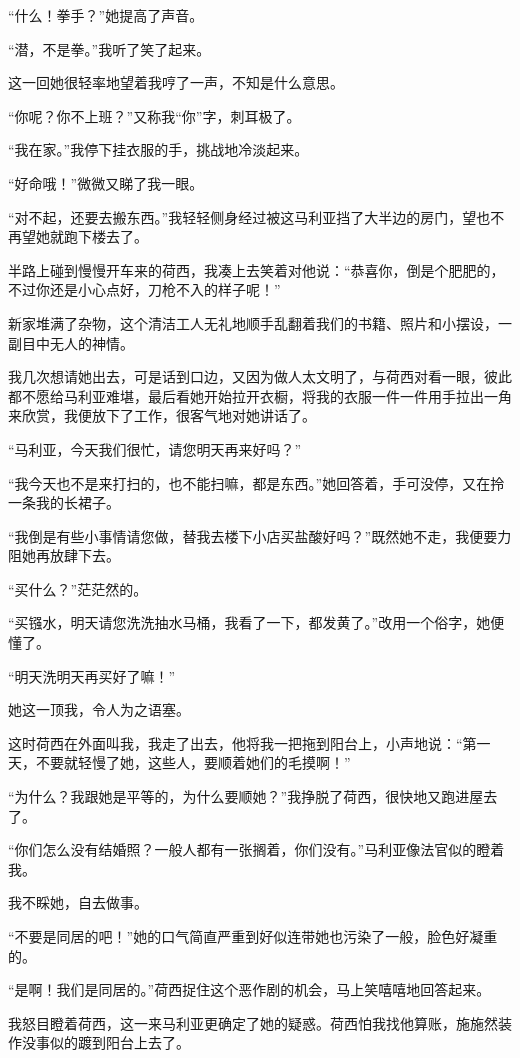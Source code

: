 \par “什么！拳手？”她提高了声音。
\par “潜，不是拳。”我听了笑了起来。
\par 这一回她很轻率地望着我哼了一声，不知是什么意思。
\par “你呢？你不上班？”又称我“你”字，刺耳极了。
\par “我在家。”我停下挂衣服的手，挑战地冷淡起来。
\par “好命哦！”微微又睇了我一眼。
\par “对不起，还要去搬东西。”我轻轻侧身经过被这马利亚挡了大半边的房门，望也不再望她就跑下楼去了。
\par 半路上碰到慢慢开车来的荷西，我凑上去笑着对他说：“恭喜你，倒是个肥肥的，不过你还是小心点好，刀枪不入的样子呢！”
\par 新家堆满了杂物，这个清洁工人无礼地顺手乱翻着我们的书籍、照片和小摆设，一副目中无人的神情。
\par 我几次想请她出去，可是话到口边，又因为做人太文明了，与荷西对看一眼，彼此都不愿给马利亚难堪，最后看她开始拉开衣橱，将我的衣服一件一件用手拉出一角来欣赏，我便放下了工作，很客气地对她讲话了。
\par “马利亚，今天我们很忙，请您明天再来好吗？”
\par “我今天也不是来打扫的，也不能扫嘛，都是东西。”她回答着，手可没停，又在拎一条我的长裙子。
\par “我倒是有些小事情请您做，替我去楼下小店买盐酸好吗？”既然她不走，我便要力阻她再放肆下去。
\par “买什么？”茫茫然的。
\par “买镪水，明天请您洗洗抽水马桶，我看了一下，都发黄了。”改用一个俗字，她便懂了。
\par “明天洗明天再买好了嘛！”
\par 她这一顶我，令人为之语塞。
\par 这时荷西在外面叫我，我走了出去，他将我一把拖到阳台上，小声地说：“第一天，不要就轻慢了她，这些人，要顺着她们的毛摸啊！”
\par “为什么？我跟她是平等的，为什么要顺她？”我挣脱了荷西，很快地又跑进屋去了。
\par “你们怎么没有结婚照？一般人都有一张搁着，你们没有。”马利亚像法官似的瞪着我。
\par 我不睬她，自去做事。
\par “不要是同居的吧！”她的口气简直严重到好似连带她也污染了一般，脸色好凝重的。
\par “是啊！我们是同居的。”荷西捉住这个恶作剧的机会，马上笑嘻嘻地回答起来。
\par 我怒目瞪着荷西，这一来马利亚更确定了她的疑惑。荷西怕我找他算账，施施然装作没事似的踱到阳台上去了。
